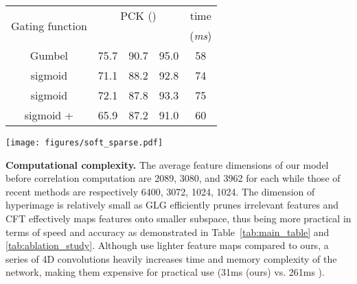 \documentclass[runningheads]{llncs}
\begin{document}
\begin{table}[!t]
\begin{minipage}{.48\linewidth}
            
        \begin{center}
            \begin{tabular}{ccccc}
                \toprule
                \multirow{2}{*}{Gating function} & \multicolumn{3}{c}{PCK ()} & time \\
                &  &  &  & ({\em ms}) \\ 
                \midrule
                Gumbel  & 75.7 & 90.7 & 95.0 & 58 \\
                \midrule
                sigmoid &  71.1 & 88.2 & 92.8 & 74 \\
                sigmoid & 72.1 & 87.8 & 93.3 & 75 \\
                sigmoid + & 65.9 & 87.2 & 91.0 & 60 \\
                \bottomrule
        \end{tabular}
        \end{center}
        
        \begin{center}
        \texttt{[image: figures/soft\_sparse.pdf]}
        \end{center}
        
    \end{minipage} 
\end{table}

\smallbreak
\noindent \textbf{Computational complexity.}
The average feature dimensions of our model before correlation computation are 2089, 3080, and 3962 for each  while those of recent methods \cite{min2019hyperpixel,lee2019sfnet,rocco2018neighbourhood,huang2019dynamic} are respectively 6400, 3072, 1024, 1024. The dimension of hyperimage is relatively small as GLG efficiently prunes irrelevant features and CFT effectively maps features onto smaller subspace, thus being more practical in terms of speed and accuracy as demonstrated in Table~\ref{tab:main_table} and \ref{tab:ablation_study}. Although \cite{rocco2018neighbourhood,huang2019dynamic} use lighter feature maps compared to ours, a series of 4D convolutions heavily increases time and memory complexity of the network, making them expensive for practical use (31ms (ours) vs. 261ms \cite{rocco2018neighbourhood,huang2019dynamic}).
\end{document}
